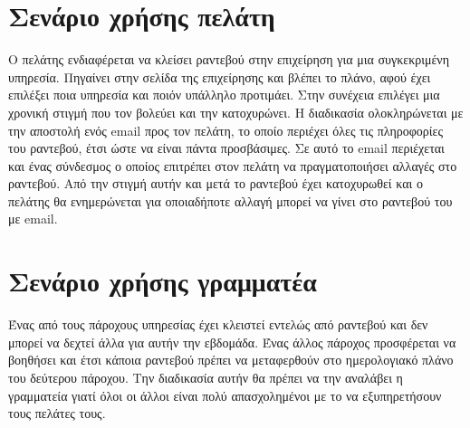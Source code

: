\section{Σενάριο χρήσης πελάτη}
Ο πελάτης ενδιαφέρεται να κλείσει ραντεβού στην επιχείρηση για μια συγκεκριμένη υπηρεσία. Πηγαίνει στην σελίδα της επιχείρησης και βλέπει το πλάνο, αφού έχει επιλέξει ποια υπηρεσία και ποιόν υπάλληλο προτιμάει. Στην συνέχεια επιλέγει μια χρονική στιγμή που τον βολεύει και την κατοχυρώνει. Η διαδικασία ολοκληρώνεται με την αποστολή ενός email προς τον πελάτη, το οποίο περιέχει όλες τις πληροφορίες του ραντεβού, έτσι ώστε να είναι πάντα προσβάσιμες. Σε αυτό το email περιέχεται και ένας σύνδεσμος ο οποίος επιτρέπει στον πελάτη να πραγματοποιήσει αλλαγές στο ραντεβού. Από την στιγμή αυτήν και μετά το ραντεβού έχει κατοχυρωθεί και ο πελάτης θα ενημερώνεται για οποιαδήποτε αλλαγή μπορεί να γίνει στο ραντεβού του με email.

\section{Σενάριο χρήσης γραμματέα}
Ένας από τους πάροχους υπηρεσίας έχει κλειστεί εντελώς από ραντεβού και δεν μπορεί να δεχτεί άλλα για αυτήν την εβδομάδα. Ένας άλλος πάροχος προσφέρεται να βοηθήσει και έτσι κάποια ραντεβού πρέπει να μεταφερθούν στο ημερολογιακό πλάνο του δεύτερου πάροχου. Την διαδικασία αυτήν θα πρέπει να την αναλάβει η γραμματεία γιατί όλοι οι άλλοι είναι πολύ απασχολημένοι με το να εξυπηρετήσουν τους πελάτες τους.